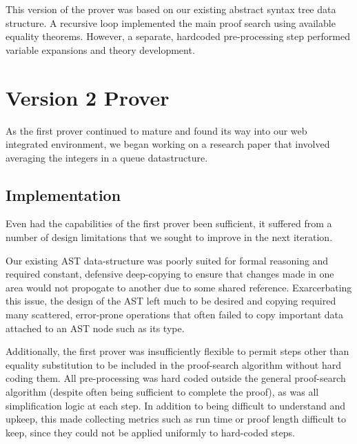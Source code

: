 This version of the prover was based on our existing abstract syntax tree data structure.  A recursive loop implemented the main proof search using available equality theorems.  However, a separate, hardcoded pre-processing step performed variable expansions and theory development.


\section{Version 2 Prover}

As the first prover continued to mature and found its way into our web integrated environment, we began working on a research paper that involved averaging the integers in a queue datastructure.

	\subsection{Implementation}

Even had the capabilities of the first prover been sufficient, it suffered from a number of design limitations that we sought to improve in the next iteration.

Our existing AST data-structure was poorly suited for formal reasoning and required constant, defensive deep-copying to ensure that changes made in one area would not propogate to another due to some shared reference.  Exarcerbating this issue, the design of the AST left much to be desired and copying required many scattered, error-prone operations that often failed to copy important data attached to an AST node such as its type.

Additionally, the first prover was insufficiently flexible to permit steps other than equality substitution to be included in the proof-search algorithm without hard coding them.  All pre-processing was hard coded outside the general proof-search algorithm (despite often being sufficient to complete the proof), as was all simplification logic at each step.  In addition to being difficult to understand and upkeep, this made collecting metrics such as run time or proof length difficult to keep, since they could not be applied uniformly to hard-coded steps.

